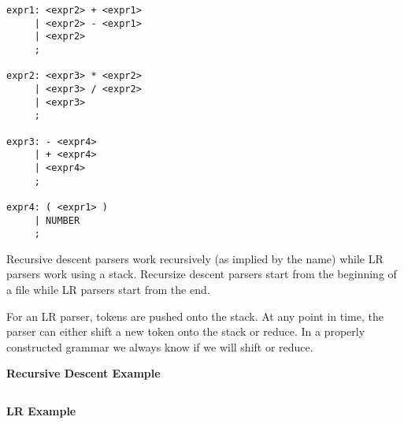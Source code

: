 \documentclass[11pt]{article}
\begin{document}
\begin{lstlisting}
expr1: <expr2> + <expr1>
     | <expr2> - <expr1>
     | <expr2>
     ;

expr2: <expr3> * <expr2>
     | <expr3> / <expr2>
     | <expr3>
     ;

expr3: - <expr4>
     | + <expr4>
     | <expr4>
     ;

expr4: ( <expr1> )
     | NUMBER
     ;
\end{lstlisting}


Recursive descent parsers work recursively (as implied by the name) while LR
parsers work using a stack.  Recursize descent parsers start from the beginning
of a file while LR parsers start from the end.

For an LR parser, tokens are pushed onto the stack.  At any point in time, the
parser can either shift a new token onto the stack or reduce.  In a properly
constructed grammar we always know if we will shift or reduce.  

\textbf{Recursive Descent Example}


\begin{lstlisting}
\end{lstlisting}

\textbf{LR Example}


\begin{lstlisting}
\end{lstlisting}
\end{document}
